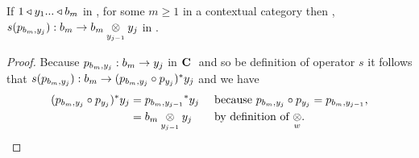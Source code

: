 \begin{lemma}
If $1 \base y_1 ... \base b_m$ in \catc, for some $m \ge 1$ in a contextual category \catcw then \foreachj,
$s(p_{b_m,y_j}): b_m \morph \crossx{b_m}{y_j}{y_{j-1}}$ in \catcw.
\end{lemma}
\begin{proof}
Because $p_{b_m,y_j}: b_m \morph y_j$ in $\catcw$ and so be definition of operator $s$ it follows that $s(p_{b_m,y_j}): b_m  \morph (p_{b_m,y_j} \circ p_{y_j})^*y_j$
and we have 
\begin{align*}
(p_{b_m,y_j} \circ p_{y_j})^*y_j &= {p_{b_m,y_{j-1}}} ^*y_j  && \mbox{ because $p_{b_m,y_j} \circ p_{y_j}=p_{b_m,y_{j-1}}$,} \\
                                 &= \crossx{b_m}{y_j}{y_{j-1}} && \mbox{ by definition of $\crossx{}{}{w}$}.
\end{align*}
\end{proof}

